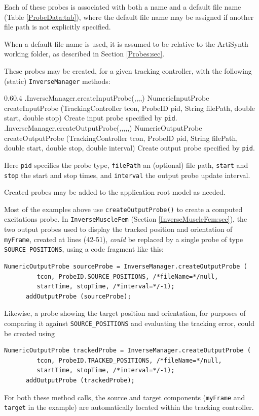 Each of these probes is associated with both a name and a default file name
(Table \ref{ProbeData:tab}), where the default file name may be assigned if
another file path is not explicitly specified.

\begin{sideblock}
When a default file name is used, it is assumed to be relative to the ArtiSynth
working folder, as described in Section \ref{Probes:sec}.
\end{sideblock}

These probes may be created, for a given tracking controller, with the
following (static) {\tt InverseManager} methods:
%
\begin{methodtable}{0.6}{0.4}
\midline
%
\methodentry
{\inverse.InverseManager.createInputProbe(,,,,)}%
{NumericInputProbe createInputProbe (TrackingController tcon,\brh
ProbeID pid, String filePath, double start, double stop)}%
{Create input probe specified by {\tt pid}.}%
%
\methodspace{0.5em}%
\methodentry
{\inverse.InverseManager.createOutputProbe(,,,,,)}%
{NumericOutputProbe createOutputProbe (TrackingController tcon,\brh
ProbeID pid, String filePath, double start, double stop, \brh double interval)}%
{Create output probe specified by {\tt pid}.}%
%
\midline
\end{methodtable}
%
Here {\tt pid} specifies the probe type, {\tt filePath} an (optional) file
path, {\tt start} and {\tt stop} the start and stop times, and {\tt interval}
the output probe update interval.

Created probes may be added to the application root model as needed.

Most of the examples above use {\tt createOutputProbe()} to create a computed
excitations probe. In {\tt InverseMuscleFem}
(Section \ref{InverseMuscleFem:sec}), the two output probes used to display the
tracked position and orientation of {\tt myFrame}, created at lines (42-51),
{\it could} be replaced by a single probe of type {\tt SOURCE\_POSITIONS},
using a code fragment like this:
%
\begin{lstlisting}[]
      NumericOutputProbe sourceProbe = InverseManager.createOutputProbe (
         tcon, ProbeID.SOURCE_POSITIONS, /*fileName=*/null,
         startTime, stopTime, /*interval=*/-1);
      addOutputProbe (sourceProbe);
\end{lstlisting}
%
Likewise, a probe showing the target position and orientation, for purposes of
comparing it against {\tt SOURCE\_POSITIONS} and evaluating the tracking error,
could be created using
%
\begin{lstlisting}[]
      NumericOutputProbe trackedProbe = InverseManager.createOutputProbe (
         tcon, ProbeID.TRACKED_POSITIONS, /*fileName=*/null,
         startTime, stopTime, /*interval=*/-1);
      addOutputProbe (trackedProbe);
\end{lstlisting}
%
For both these method calls, the source and target components ({\tt myFrame}
and {\tt target} in the example) are automatically located within the tracking
controller.

